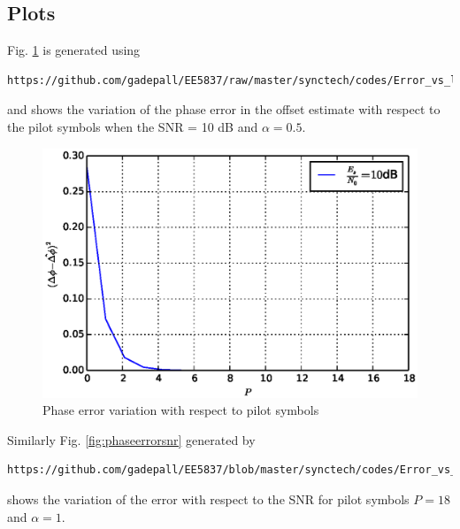 \documentclass[journal,12pt,twocolumn]{IEEEtran}
\begin{document}
\subsection{Plots}
Fig. \ref{fig:phaseerrorp} is generated using 
\begin{lstlisting}
https://github.com/gadepall/EE5837/raw/master/synctech/codes/Error_vs_lp.py
\end{lstlisting}
and  shows the variation of the phase error in the offset estimate with respect to the pilot symbols  when the 
SNR = 10 dB and $\alpha = 0.5$.

\begin{figure}[!ht]
\begin{center}
\includegraphics[width=\columnwidth]{./figs/Phase_error_with_respect_to_pilots.eps}
\end{center}
\caption{Phase error variation with respect to pilot symbols }
\label{fig:phaseerrorp}
\end{figure}
%
Similarly Fig. \ref{fig:phaseerrorsnr} generated by 
\begin{lstlisting}
https://github.com/gadepall/EE5837/blob/master/synctech/codes/Error_vs_snr.py
\end{lstlisting}
shows the variation of the error with 
respect 
to the SNR for pilot symbols $P = 18$ and  $\alpha = 1$.
\end{document}
